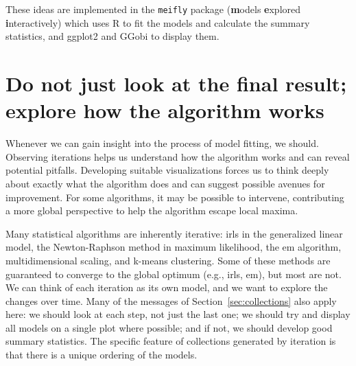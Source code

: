 \documentclass[preprint]{imsart}
\begin{document}

%

These ideas are implemented in the {\tt meifly} package ({\bf m}odels {\bf e}xplored {\bf i}nteractively) \citep{meifly} which uses R to fit the models and calculate the summary statistics, and ggplot2 and GGobi to display them.

\section{Do not just look at the final result; explore how the algorithm works}
\label{sec:iteration}

Whenever we can gain insight into the process of model fitting, we should. Observing iterations helps us understand how the algorithm works and can reveal potential pitfalls. Developing suitable visualizations forces us to think deeply about exactly what the algorithm does and can suggest possible avenues for improvement. For some algorithms, it may be possible to intervene, contributing a more global perspective to help the algorithm escape local maxima.

Many statistical algorithms are inherently iterative: {\sc irls} in the generalized linear model, the Newton-Raphson method in maximum likelihood, the {\sc em} algorithm, multidimensional scaling, and k-means clustering.  Some of these methods are guaranteed to converge to the global optimum (e.g., {\sc irls}, {\sc em}), but most are not.  We can think of each iteration as its own model, and we want to explore the changes over time.  Many of the messages of Section~\ref{sec:collections} also apply here: we should look at each step, not just the last one; we should try and display all models on a single plot where possible; and if not, we should develop good summary statistics.  The specific feature of collections generated by iteration is that there is a unique ordering of the models.
\end{document}

